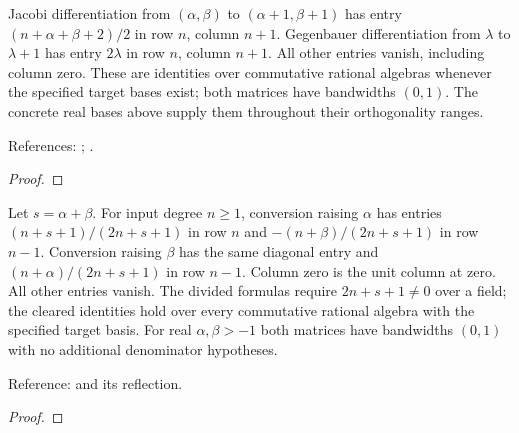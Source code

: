 \begin{theorem}
\label{thm:classical-derivative-matrices}
\leanok
Jacobi differentiation from $(\alpha,\beta)$ to $(\alpha+1,\beta+1)$ has
entry $(n+\alpha+\beta+2)/2$ in row $n$, column $n+1$.
Gegenbauer differentiation from $\lambda$ to $\lambda+1$ has entry $2\lambda$
in row $n$, column $n+1$. All other entries vanish, including column zero.
These are identities over commutative rational algebras whenever the specified
target bases exist; both matrices have bandwidths $(0,1)$.
The concrete real bases above supply them throughout their orthogonality ranges.

References: \cite[18.9.15, 18.9.19]{dlmf}; \cite{olver-townsend}.
\end{theorem}
\begin{proof}
\leanok
\end{proof}

\begin{theorem}
\label{thm:jacobi-conversion-matrices}
\leanok
Let $s=\alpha+\beta$. For input degree $n\ge1$, conversion raising $\alpha$
has entries $(n+s+1)/(2n+s+1)$ in row $n$ and
$-(n+\beta)/(2n+s+1)$ in row $n-1$.
Conversion raising $\beta$ has the same diagonal entry and
$(n+\alpha)/(2n+s+1)$ in row $n-1$.
Column zero is the unit column at zero. All other entries vanish.
The divided formulas require $2n+s+1\ne0$ over a field; the cleared identities
hold over every commutative rational algebra with the specified target basis.
For real $\alpha,\beta>-1$ both matrices have bandwidths $(0,1)$ with no
additional denominator hypotheses.

Reference: \cite[18.9.5]{dlmf} and its reflection.
\end{theorem}
\begin{proof}
\leanok
\end{proof}

